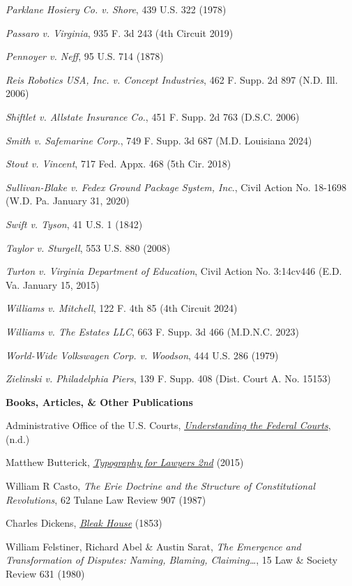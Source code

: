 \textit{Parklane Hosiery Co. v. Shore}, 439 U.S. 322 (1978)

\textit{Passaro v. Virginia}, 935 F. 3d 243 (4th Circuit 2019)

\textit{Pennoyer v. Neff}, 95 U.S. 714 (1878)

\textit{Reis Robotics USA, Inc. v. Concept Industries}, 462 F. Supp. 2d 897 (N.D. Ill. 2006)

\textit{Shiftlet v. Allstate Insurance Co.}, 451 F. Supp. 2d 763 (D.S.C. 2006)

\textit{Smith v. Safemarine Corp.}, 749 F. Supp. 3d 687 (M.D. Louisiana 2024)

\textit{Stout v. Vincent}, 717 Fed. Appx. 468 (5th Cir. 2018)

\textit{Sullivan-Blake v. Fedex Ground Package System, Inc}., Civil Action No. 18-1698 (W.D. Pa. January 31, 2020)

\textit{Swift v. Tyson}, 41 U.S. 1 (1842)

\textit{Taylor v. Sturgell}, 553 U.S. 880 (2008)

\textit{Turton v. Virginia Department of Education}, Civil Action No. 3:14cv446 (E.D. Va. January 15, 2015)

\textit{Williams v. Mitchell}, 122 F. 4th 85 (4th Circuit 2024)

\textit{Williams v. The Estates LLC}, 663 F. Supp. 3d 466 (M.D.N.C. 2023)

\textit{World-Wide Volkswagen Corp. v. Woodson}, 444 U.S. 286 (1979)

\textit{Zielinski v. Philadelphia Piers}, 139 F. Supp. 408 (Dist. Court A. No. 15153)

\vspace{2em}

{\bfseries\Large{Books, Articles, \& Other Publications}}

Administrative Office of the U.S. Courts, \href{https://www.uscourts.gov/sites/default/files/understanding-federal-courts.pdf}{\textit{Understanding the Federal Courts}}, (n.d.)

Matthew Butterick, \href{https://typographyforlawyers.com}{\textit{Typography for Lawyers 2nd}} (2015)

William R Casto, \textit{The Erie Doctrine and the Structure of Constitutional Revolutions}, 62 Tulane Law Review 907 (1987)

Charles Dickens, \href{https://standardebooks.org/ebooks/charles-dickens/bleak-house}{\textit{Bleak House}} (1853)

William Felstiner, Richard Abel \& Austin Sarat, \textit{The Emergence and Transformation of Disputes: Naming, Blaming, Claiming…}, 15 Law \& Society Review 631 (1980)

